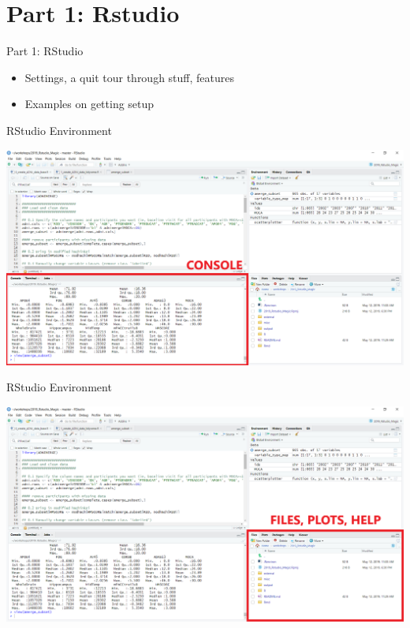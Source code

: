 \documentclass[
  ignorenonframetext,
]{beamer}
\providecommand{\tightlist}{%
  \setlength{\itemsep}{0pt}\setlength{\parskip}{0pt}}
\begin{document}
\hypertarget{part-1-rstudio}{%
\section{Part 1: Rstudio}\label{part-1-rstudio}}

\begin{frame}{Part 1: RStudio}
\protect\hypertarget{part-1-rstudio-1}{}

\begin{itemize}
\tightlist
\item
  Settings, a quit tour through stuff, features
\item
  Examples on getting setup
\end{itemize}

\end{frame}

\begin{frame}{RStudio Environment}
\protect\hypertarget{rstudio-environment}{}

\includegraphics{../external/images/rstudio_terminal_1_CONSOLE.png}

\end{frame}

\begin{frame}{RStudio Environment}
\protect\hypertarget{rstudio-environment-1}{}

\includegraphics{../external/images/rstudio_terminal_2_FILES.png}

\end{frame}
\end{document}
